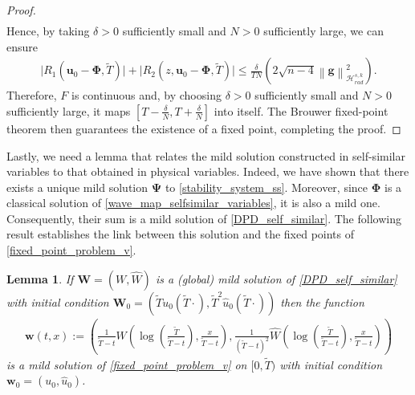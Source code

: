 \documentclass[12pt,reqno]{amsart}
\theoremstyle{plain}
\theoremstyle{remark}
\theoremstyle{plain}
\newtheorem{lemma}[theorem]{Lemma}
\theoremstyle{definition}
\numberwithin{equation}{section}
\numberwithin{equation}{section}
\newcommand{\norm}[1]{\left\|#1\right\|}
\newcommand{\HH}{\mathcal{H}}
\begin{document}
\begin{proof}
\begin{align*}
		\end{align*}
		Hence, by taking $\delta>0$ sufficiently small and $N>0$ sufficiently large, we can ensure
		\begin{align*}
			\lvert R_{1}(\mathbf{u}_0-\mathbf{\Phi},\tilde{T})\rvert+\lvert R_2(z,\mathbf{u}_0-\mathbf{\Phi},\tilde{T})\rvert\leq \frac{\delta}{T N}\left(2\sqrt{n-4}\norm{\mathbf{g}}_{\HH_{rad}^{s,k}}^2\right).
		\end{align*}
		Therefore, $F$ is continuous and, by choosing $\delta>0$ sufficiently small and $N>0$ sufficiently large, it maps $[T-\frac{\delta}{N},T+\frac{\delta}{N}]$ into itself. The Brouwer fixed-point theorem then guarantees the existence of a fixed point, completing the proof.
	\end{proof}
	Lastly, we need a lemma that relates the mild solution constructed in self-similar variables to that obtained in physical variables. Indeed, we have shown that there exists a unique mild solution $\mathbf{\Psi}$ to \eqref{stability_system_ss}. Moreover, since $\mathbf{\Phi}$ is a classical solution of \eqref{wave_map_selfsimilar_variables}, it is also a mild one. Consequently, their sum is a mild solution of \eqref{DPD_self_similar}.
	The following result establishes the link between this solution and the fixed points of \eqref{fixed_point_problem_v}.
	\begin{lemma}\label{lemma_reconstruction_solution}
		If $\mathbf{W}=(W,\hat{W})$ is a (global) mild solution of \eqref{DPD_self_similar} with initial condition $\mathbf{W}_0=(\tilde{T} u_0(\tilde{T}\cdot),\tilde{T}^2 \hat{u}_0(\tilde{T}\cdot))$ then the function
		\begin{align*}
			\mathbf{w}(t,x):=\left(\frac{1}{\tilde{T}-t}W\left(\log\left(\frac{\tilde{T}}{\tilde{T}-t}\right),\frac{x}{\tilde{T}-t}\right),\frac{1}{(\tilde{T}-t)^2}\hat{W}\left(\log\left(\frac{\tilde{T}}{\tilde{T}-t}\right),\frac{x}{\tilde{T}-t}\right)\right)
		\end{align*}
		is a mild solution of \eqref{fixed_point_problem_v} on $[0,\tilde{T})$ with initial condition $\mathbf{w}_0=( u_0,\hat{u}_0)$.
	\end{lemma}
\end{document}
